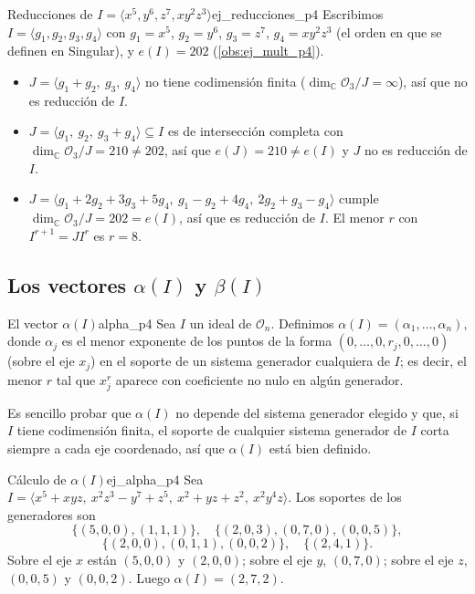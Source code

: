 \documentclass[11pt,a4paper]{article}
\begin{document}
\begin{observacion}{Reducciones de $I = \langle x^5, y^6, z^7, xy^2z^3 \rangle$}{ej_reducciones_p4}
Escribimos $I = \langle g_1, g_2, g_3, g_4 \rangle$ con $g_1 = x^5$, $g_2 = y^6$, $g_3 = z^7$, $g_4 = xy^2z^3$ (el orden en que se definen en Singular), y $e(I) = 202$ (\cref{obs:ej_mult_p4}).
\begin{itemize}
    \item $J = \langle g_1 + g_2,\ g_3,\ g_4 \rangle$ no tiene codimensión finita ($\dim_{\mathbb{C}} \mathcal{O}_3/J = \infty$), así que no es reducción de $I$.
    \item $J = \langle g_1,\ g_2,\ g_3 + g_4 \rangle \subseteq I$ es de intersección completa con $\dim_{\mathbb{C}} \mathcal{O}_3/J = 210 \neq 202$, así que $e(J) = 210 \neq e(I)$ y $J$ no es reducción de $I$.
    \item $J = \langle g_1 + 2g_2 + 3g_3 + 5g_4,\ g_1 - g_2 + 4g_4,\ 2g_2 + g_3 - g_4 \rangle$ cumple $\dim_{\mathbb{C}} \mathcal{O}_3/J = 202 = e(I)$, así que es reducción de $I$. El menor $r$ con $I^{r+1} = J I^r$ es $r = 8$.
\end{itemize}
\end{observacion}

\subsection*{Los vectores $\alpha(I)$ y $\beta(I)$}

\begin{definicion}{El vector $\alpha(I)$}{alpha_p4}
Sea $I$ un ideal de $\mathcal{O}_n$. Definimos $\alpha(I) = (\alpha_1, \dots, \alpha_n)$, donde $\alpha_j$ es el menor exponente de los puntos de la forma $(0, \dots, 0, r_j, 0, \dots, 0)$ (sobre el eje $x_j$) en el soporte de un sistema generador cualquiera de $I$; es decir, el menor $r$ tal que $x_j^r$ aparece con coeficiente no nulo en algún generador.

Es sencillo probar que $\alpha(I)$ no depende del sistema generador elegido y que, si $I$ tiene codimensión finita, el soporte de cualquier sistema generador de $I$ corta siempre a cada eje coordenado, así que $\alpha(I)$ está bien definido.
\end{definicion}

\begin{observacion}{Cálculo de $\alpha(I)$}{ej_alpha_p4}
Sea $I = \langle x^5 + xyz,\ x^2z^3 - y^7 + z^5,\ x^2 + yz + z^2,\ x^2y^4z \rangle$. Los soportes de los generadores son
\[ \{(5,0,0), (1,1,1)\}, \quad \{(2,0,3), (0,7,0), (0,0,5)\}, \]
\[ \{(2,0,0), (0,1,1), (0,0,2)\}, \quad \{(2,4,1)\}. \]
Sobre el eje $x$ están $(5,0,0)$ y $(2,0,0)$; sobre el eje $y$, $(0,7,0)$; sobre el eje $z$, $(0,0,5)$ y $(0,0,2)$. Luego $\alpha(I) = (2,7,2)$.
\end{observacion}
\end{document}
